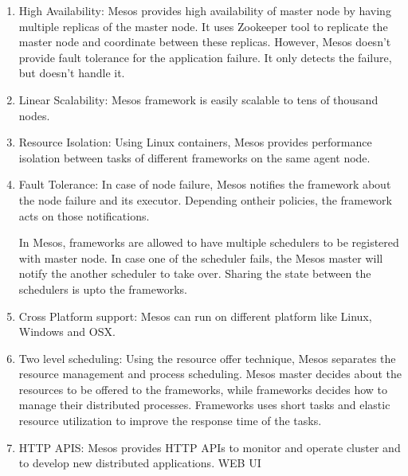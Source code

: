 \begin{enumerate}
\item High Availability: Mesos provides high availability of master node by having multiple replicas of the master node. It uses Zookeeper tool to replicate the master node and coordinate between these replicas. However, Mesos doesn't provide fault tolerance for the application failure. It only detects the failure, but doesn't handle it.

\item Linear Scalability: Mesos framework is easily scalable to tens of thousand nodes.

\item Resource Isolation: Using Linux containers, Mesos provides performance isolation between tasks of different frameworks on the same agent node.

\item Fault Tolerance: In case of node failure, Mesos notifies the framework about the node failure and its executor. Depending ontheir policies, the framework acts on those notifications.

In Mesos, frameworks are allowed to have multiple schedulers to be registered with master node. In case one of the scheduler fails, the Mesos master will notify the another scheduler to take over. Sharing the state between the schedulers is upto the frameworks.

\item Cross Platform support: Mesos can run on different platform like Linux, Windows and OSX.

\item Two level scheduling: Using the resource offer technique, Mesos separates the resource management and process scheduling.  Mesos master decides about the resources to be offered to the frameworks, while frameworks decides how to manage their distributed processes. Frameworks uses short tasks and elastic resource utilization to improve the response time of the tasks.

\item HTTP APIS: Mesos provides HTTP APIs to monitor and operate cluster and to develop new distributed applications.
WEB UI

\end{enumerate}



















